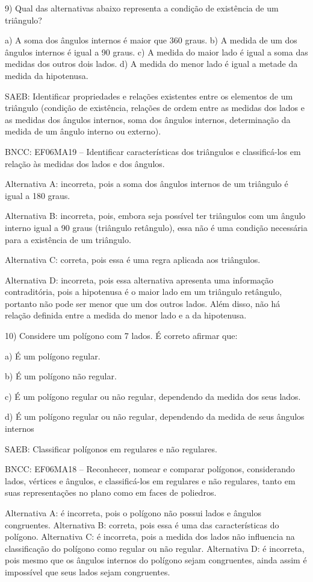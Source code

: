 9) Qual das alternativas abaixo representa a condição de existência de
um triângulo?

a) A soma dos ângulos internos é maior que 360 graus. b) A medida de um
dos ângulos internos é igual a 90 graus. c) A medida do maior lado é
igual a soma das medidas dos outros dois lados. d) A medida do menor
lado é igual a metade da medida da hipotenusa.

SAEB: Identificar propriedades e relações existentes entre os elementos
de um triângulo (condição de existência, relações de ordem entre as
medidas dos lados e as medidas dos ângulos internos, soma dos ângulos
internos, determinação da medida de um ângulo interno ou externo).

BNCC: EF06MA19 -- Identificar características dos triângulos e
classificá-los em relação às medidas dos lados e dos ângulos.

Alternativa A: incorreta, pois a soma dos ângulos internos de um
triângulo é igual a 180 graus.

Alternativa B: incorreta, pois, embora seja possível ter triângulos com
um ângulo interno igual a 90 graus (triângulo retângulo), essa não é uma
condição necessária para a existência de um triângulo.

Alternativa C: correta, pois essa é uma regra aplicada aos triângulos.

Alternativa D: incorreta, pois essa alternativa apresenta uma informação
contraditória, pois a hipotenusa é o maior lado em um triângulo
retângulo, portanto não pode ser menor que um dos outros lados. Além
disso, não há relação definida entre a medida do menor lado e a da
hipotenusa.

10) Considere um polígono com 7 lados. É correto afirmar que:

a) É um polígono regular.

b) É um polígono não regular.

c) É um polígono regular ou não regular, dependendo da medida dos seus
lados.

d) É um polígono regular ou não regular, dependendo da medida de seus
ângulos internos

SAEB: Classificar polígonos em regulares e não regulares.

BNCC: EF06MA18 -- Reconhecer, nomear e comparar polígonos, considerando
lados, vértices e ângulos, e classificá-los em regulares e não
regulares, tanto em suas representações no plano como em faces de
poliedros.

Alternativa A: é incorreta, pois o polígono não possui lados e ângulos
congruentes. Alternativa B: correta, pois essa é uma das características
do polígono. Alternativa C: é incorreta, pois a medida dos lados não
influencia na classificação do polígono como regular ou não regular.
Alternativa D: é incorreta, pois mesmo que os ângulos internos do
polígono sejam congruentes, ainda assim é impossível que seus lados
sejam congruentes.

